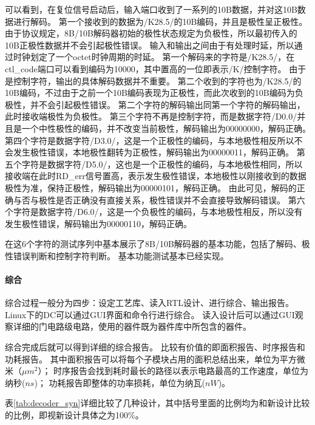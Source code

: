 \documentclass[UTF8]{ctexart}
\begin{document}
可以看到，在复位信号启动后，输入端口收到了一系列的10B数据，并对这10B数据进行解码。
第一个接收到的数据为/K28.5/的10B编码，并且是极性呈正极性。
由于协议规定，8B/10B解码器初始的极性状态规定为负极性，所以最初传入的10B正极性数据并不会引起极性错误。
输入和输出之间由于有处理时延，所以通过时钟划定了一个octet时钟周期的时延。
第一个解码来的字符是/K28.5/，在ctl\_code端口可以看到编码为10000，其中置高的一位即表示/K/控制字符。
由于是控制字符，输出的具体解码数据并不重要。
第二个收到的字符也为/K28.5/的10B编码，不过由于之前一个10B编码表现为正极性，而此次收到的10B编码为负极性，并不会引起极性错误。
第二个字符的解码输出同第一个字符的解码输出，此时接收端极性为负极性。
第三个字符不再是控制字符，而是数据字符/D0.0/并且是一个中性极性的编码，并不改变当前极性，解码输出为00000000，解码正确。
第四个字符是数据字符/D3.0/，这是一个正极性的编码，与本地极性相反所以不会发生极性错误，本地极性翻转为正极性，解码输出为00000011，解码正确。
第五个字符是数据字符/D5.0/，这也是一个正极性的编码，与本地极性相同，所以接收端在此时RD\_err信号置高，表示发生极性错误，本地极性以刚接收到的数据极性为准，保持正极性，解码输出为00000101，解码正确。
由此可见，解码的正确与否与极性是否正确没有直接关系，极性错误并不会直接导致解码错误。
第六个字符是数据字符/D6.0/，这是一个负极性的编码，与本地极性相反，所以没有发生极性错误，解码输出为00000110，解码正确。

在这6个字符的测试序列中基本展示了8B/10B解码器的基本功能，包括了解码、极性错误判断和控制字符判断。
基本功能测试基本已经实现。

\paragraph{综合}

综合过程一般分为四步：设定工艺库、读入RTL设计、进行综合、输出报告。
Linux下的DC可以通过GUI界面和命令行进行综合。
读入设计后可以通过GUI观察详细的门电路级电路，使用的器件既为器件库中所包含的器件。

综合完成后就可以得到详细的综合报告。
比较有价值的即面积报告、时序报告和功耗报告。
其中面积报告可以将每个子模块占用的面积总结出来，单位为平方微米（$\mu m^2$）；
时序报告会找到耗时最长的路径以表示电路最高的工作速度，单位为纳秒($ns$)；
功耗报告即整体的功率损耗，单位为纳瓦($nW$)。

表\ref{tab:decoder_syn}详细比较了几种设计，其中括号里面的比例均为和新设计比较的比例，即视新设计具体之为100\%。
\end{document}
